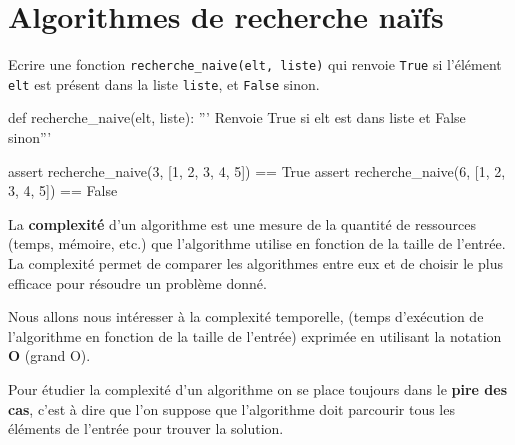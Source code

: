 \def\level{Première}  %
\def\course{NSI}
\def\chaptername{Algorithmes de recherche} %
\def\docname{AP06}        %

\pagestyle{cours_FP}
\makeheader{} %

\section{Algorithmes de recherche naïfs}


\begin{exercice_cours}{}
	Ecrire une fonction \texttt{recherche\_naive(elt, liste)} qui renvoie \texttt{True} si l'élément \texttt{elt} est présent dans la liste \texttt{liste}, et \texttt{False} sinon.
	\begin{CodePythontexAlt}[TaillePolice=\normalsize, Largeur=1\linewidth,Centre,PremLigne=1, Lignes=true,]{}
def recherche_naive(elt, liste):
	''' Renvoie True si elt est dans liste et False sinon'''









assert recherche_naive(3, [1, 2, 3, 4, 5]) == True
assert recherche_naive(6, [1, 2, 3, 4, 5]) == False
		\end{CodePythontexAlt}
\end{exercice_cours}


\begin{definition}{}
	La \textbf{complexité} d'un algorithme est une mesure de la quantité de ressources (temps, mémoire, etc.) que l'algorithme utilise en fonction de la taille de l'entrée. La complexité permet de comparer les algorithmes entre eux et de choisir le plus efficace pour résoudre un problème donné.	

	Nous allons nous intéresser à la complexité temporelle, (temps d'exécution de l'algorithme en fonction de la taille de l'entrée) exprimée en utilisant la notation \textbf{O} (grand O).
	
	Pour étudier la complexité d'un algorithme on se place toujours dans le \textbf{pire des cas}, c'est à dire que l'on suppose que l'algorithme doit parcourir tous les éléments de l'entrée pour trouver la solution.
\end{definition}

